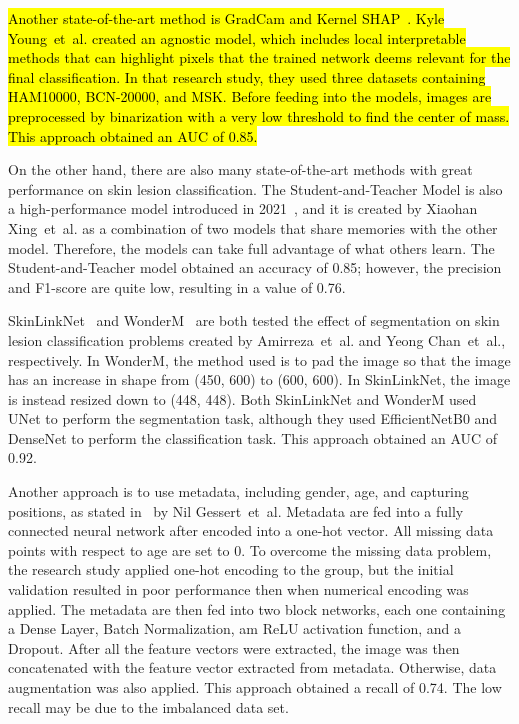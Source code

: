 \documentclass[sensors,article,accept,pdftex,moreauthors]{Definitions/mdpi}
\begin{document}
{		\hl{Another state-of-the-art method is GradCam and Kernel SHAP~\mbox{\cite{06612}}. Kyle Young~et~al. created an agnostic model, which includes local interpretable methods that can highlight pixels that the trained network deems relevant for the final classification. In that research study, they used three datasets containing HAM10000, BCN-20000, and MSK. Before feeding into the models,  images are preprocessed by binarization with a very low threshold to find the center of mass. This approach obtained an  AUC of 0.85.} %
		
		On the other hand, there are also many state-of-the-art methods with great performance on skin lesion classification. The Student-and-Teacher Model is also a high-performance model introduced in 2021~\mbox{\cite{03225}}, and it is created by Xiaohan Xing~et~al. as a combination of two models that share  memories with the other model. Therefore, the models can take full advantage of what others learn. The Student-and-Teacher model obtained an accuracy of 0.85; however, the precision and F1-score are quite low, resulting in a value of 0.76.
		
		SkinLinkNet~\mbox{\cite{12602}} and WonderM~\mbox{\cite{03426}} are both tested the effect of segmentation on skin lesion classification problems created by Amirreza~et~al. and Yeong Chan~et~al., respectively. In WonderM, the method used is to pad the image so that the image has an increase in shape  from (450, 600) to (600, 600). In SkinLinkNet,  the image is instead resized down to (448, 448). Both  SkinLinkNet and WonderM used UNet to perform the segmentation task, although they used EfficientNetB0 and DenseNet to perform the classification task. This approach obtained an AUC of 0.92.
		
		Another approach is to use metadata, including gender, age, and capturing positions, as stated in~\mbox{\cite{03910}} by Nil Gessert~et~al.  Metadata are fed into a fully connected neural network after  encoded into a one-hot vector. All missing data points with respect to age are set to 0. To overcome the missing data problem, the research study applied one-hot encoding to the group, but the initial validation resulted in poor performance then when numerical encoding was applied. The metadata are then fed into two block networks, each one containing a Dense Layer, Batch Normalization, am ReLU activation function, and a Dropout. After all the feature vectors were extracted, the image was then concatenated with the feature vector extracted from metadata. Otherwise,  data augmentation was also applied. This approach obtained a  recall of 0.74. The low recall may be due to the imbalanced data set.
		
}
\end{document}
